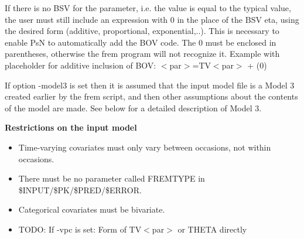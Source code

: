 If there is no BSV for the parameter, i.e. the value is equal to the typical value, the user must still include an expression with 0 in the place of the BSV eta, using the desired form (additive, proportional, exponential,..). This is necessary to enable PsN to automatically add the BOV code. The 0 must be enclosed in parentheses, otherwise the frem program will not recognize it. Example with placeholder for additive inclusion of BOV:
$<$par$>$=TV$<$par$>$ + (0)

If option -model3 is set then it is assumed that the input model file is a Model 3 created earlier by the frem script, and then other assumptions about the contents of the model are made. See below for a detailed description of Model 3.

{\bf Restrictions on the input model}
\begin{itemize}
	\item Time-varying covariates must only vary between occasions, not within occasions. 
	\item There must be no parameter called FREMTYPE in \$INPUT/\$PK/\$PRED/\$ERROR.
	\item	Categorical covariates must be bivariate.
	\item TODO: If -vpc is set: Form of TV$<$par$>$ or THETA directly
\end{itemize}

